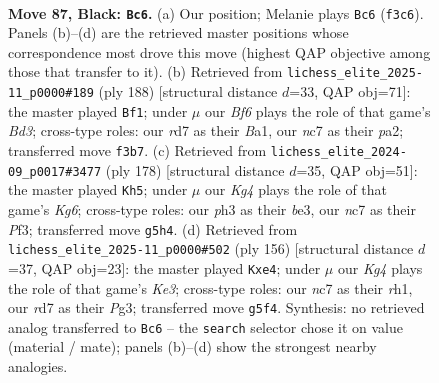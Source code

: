 \documentclass[11pt]{article}
\begin{document}
\clearpage

\begin{figure}[p]\centering
\begin{subfigure}{0.46\textwidth}\centering
\resizebox{\linewidth}{!}{%
\newchessgame
\chessboard[
  setfen={8/2NR4/8/5Pk1/np4P1/5b1P/8/5BK1 b - - 0 87},
  showmover=false,
  pgfstyle=straightmove, color=movearrow, markmove={f3-c6}
]}
\caption{}
\end{subfigure}\hfill
\begin{subfigure}{0.46\textwidth}\centering
\resizebox{\linewidth}{!}{%
\newchessgame
\chessboard[
  setfen={8/5k2/4b1p1/5p2/5KpP/3B4/p7/B7 w - - 2 95},
  showmover=false,
  pgfstyle=straightmove, color=movearrow, markmove={d3-f1}
]}
\caption{}
\end{subfigure}
\\[4pt]
\begin{subfigure}{0.46\textwidth}\centering
\resizebox{\linewidth}{!}{%
\newchessgame
\chessboard[
  setfen={2B5/8/4p1Kp/4kp2/8/4bP2/8/8 w - - 5 90},
  showmover=false,
  pgfstyle=straightmove, color=movearrow, markmove={g6-h5}
]}
\caption{}
\end{subfigure}\hfill
\begin{subfigure}{0.46\textwidth}\centering
\resizebox{\linewidth}{!}{%
\newchessgame
\chessboard[
  setfen={8/8/6k1/3R3p/4p1p1/4K1P1/8/7r w - - 20 79},
  showmover=false,
  pgfstyle=straightmove, color=movearrow, markmove={e3-e4}
]}
\caption{}
\end{subfigure}
\caption{\textbf{Move 87, Black: \texttt{Bc6}.} (a) Our position; Melanie plays \texttt{Bc6} (\texttt{f3c6}). Panels (b)--(d) are the retrieved master positions whose correspondence most drove this move (highest QAP objective among those that transfer to it). (b) Retrieved from \texttt{lichess\_elite\_2025-11\_p0000\#189} (ply 188) [structural distance $d$=33, QAP obj=71]: the master played \texttt{Bf1}; under $\mu$ our \emph{Bf6} plays the role of that game's \emph{Bd3}; cross-type roles: our \emph{r}d7 as their \emph{B}a1, our \emph{n}c7 as their \emph{p}a2; transferred move \texttt{f3b7}. (c) Retrieved from \texttt{lichess\_elite\_2024-09\_p0017\#3477} (ply 178) [structural distance $d$=35, QAP obj=51]: the master played \texttt{Kh5}; under $\mu$ our \emph{Kg4} plays the role of that game's \emph{Kg6}; cross-type roles: our \emph{p}h3 as their \emph{b}e3, our \emph{n}c7 as their \emph{P}f3; transferred move \texttt{g5h4}. (d) Retrieved from \texttt{lichess\_elite\_2025-11\_p0000\#502} (ply 156) [structural distance $d$=37, QAP obj=23]: the master played \texttt{Kxe4}; under $\mu$ our \emph{Kg4} plays the role of that game's \emph{Ke3}; cross-type roles: our \emph{n}c7 as their \emph{r}h1, our \emph{r}d7 as their \emph{P}g3; transferred move \texttt{g5f4}. Synthesis: no retrieved analog transferred to \texttt{Bc6} -- the \texttt{search} selector chose it on value (material / mate); panels (b)--(d) show the strongest nearby analogies.}
\label{fig:thought-m173}
\end{figure}
\end{document}

